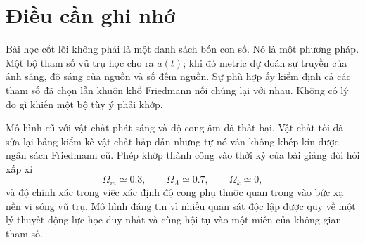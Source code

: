 \begin{classroomqa}
\end{classroomqa}

\section{Điều cần ghi nhớ}

Bài học cốt lõi không phải là một danh sách bốn con số. Nó là một phương pháp. Một bộ tham số vũ trụ học cho ra \(a(t)\); khi đó metric dự đoán sự truyền của ánh sáng, độ sáng của nguồn và số đếm nguồn. Sự phù hợp ấy kiểm định cả các tham số đã chọn lẫn khuôn khổ Friedmann nối chúng lại với nhau. Không có lý do gì khiến một bộ tùy ý phải khớp.

Mô hình cũ với vật chất phát sáng và độ cong âm đã thất bại. Vật chất tối đã sửa lại bảng kiểm kê vật chất hấp dẫn nhưng tự nó vẫn không khép kín được ngân sách Friedmann cũ. Phép khớp thành công vào thời kỳ của bài giảng đòi hỏi xấp xỉ
\begin{equation}
\Omega_m\simeq0.3,
\qquad
\Omega_\Lambda\simeq0.7,
\qquad
\Omega_k\simeq0,
\end{equation}
và độ chính xác trong việc xác định độ cong phụ thuộc quan trọng vào bức xạ nền vi sóng vũ trụ. Mô hình đáng tin vì nhiều quan sát độc lập được quy về một lý thuyết động lực học duy nhất và cùng hội tụ vào một miền của không gian tham số.
